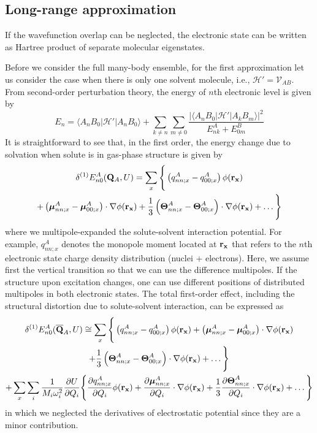 \documentclass[a4paper,titlepage,twoside,fleqn,12pt]{book}
\newcommand{\BM}[1]{\ensuremath{\mbox{\boldmath${#1}$}}}
\newcommand{\fderiv}[2]{\ensuremath{
\frac{\partial #1}{\partial #2}}}
\begin{document}
\subsection{Long-range approximation}

If the wavefunction overlap can be neglected, the electronic state
can be written as Hartree product of separate molecular eigenstates.

Before we consider the full many\hyp{}body ensemble, for the first approximation
let us consider the case when there is only
one solvent molecule, i.e., $\mathscr{H}'=\mathscr{V}_{AB}$.
From second\hyp{}order perturbation theory, the energy of $n$th electronic level
is given by
%
\begin{equation}
E_n = \langle A_nB_0 \vert \mathscr{H}' \vert A_nB_0 \rangle 
+ \sum_{k\ne n} \sum_{m\ne 0} \frac{
\lvert \langle A_nB_0 \vert \mathscr{H}' \vert A_kB_m \rangle  \rvert^2
}{E^A_{nk} + E^B_{0m}}
\end{equation}
%
It is straightforward to see that, in the first order, 
the energy change due to solvation when solute is in gas\hyp{}phase
structure is given by
%
\begin{multline}
\delta^{(1)} E^A_{n0}({\bf Q}_A, U) = \sum_{x} \Bigg\{ 
\left( q^A_{nn;x} - q^A_{00;x} \right) \phi({\bf r_x}) \\
+ \left( {\BM \mu}^A_{nn;x} - {\BM \mu}^A_{00;x} \right) \cdot \nabla \phi({\bf r_x})  
+ \frac{1}{3} \left( {\BM \Theta}^A_{nn;x} - {\BM \Theta}^A_{00;x} \right) \cdot \nabla \phi({\bf r_x}) 
+ \ldots
\Bigg\}
\end{multline}
%
where we multipole\hyp{}expanded the solute\hyp{}solvent interaction 
potential. For example, $q^A_{nn;x}$ denotes the monopole moment located at ${\bf r_x}$
that refers to the $n$th electronic state charge density distribution (nuclei + electrons).
Here, we assume first the vertical transition so that we can use the difference multipoles.
If the structure upon excitation changes, one can use different positions 
of distributed multipoles in both electronic states.
The total first\hyp{}order effect, including the structural distortion due to solute-solvent
interaction, can be expressed as
%
\begin{multline}
\delta^{(1)} E^A_{n0}({\bf \overline{Q}}_A, U) \cong \sum_{x} \Bigg\{ 
\left( q^A_{nn;x} - q^A_{00;x} \right) \phi({\bf r_x}) 
+ \left( {\BM \mu}^A_{nn;x} - {\BM \mu}^A_{00;x} \right) \cdot \nabla \phi({\bf r_x})  \\
+ \frac{1}{3} \left( {\BM \Theta}^A_{nn;x} - {\BM \Theta}^A_{00;x} \right) \cdot \nabla \phi({\bf r_x}) 
+ \ldots
\Bigg\} \\
%
+
%
\sum_{x} \sum_i \frac{1}{M_i\omega_i^2} \fderiv{U}{Q_i}
\Bigg\{ 
\fderiv{ q^A_{nn;x} }{Q_i} \phi({\bf r_x}) 
+ \fderiv{  {\BM \mu}^A_{nn;x}}{Q_i} \cdot \nabla \phi({\bf r_x})  
+ \frac{1}{3} \fderiv{ {\BM \Theta}^A_{nn;x} }{Q_i} \cdot \nabla \phi({\bf r_x}) 
+ \ldots
\Bigg\}
\end{multline}
%
in which we neglected the derivatives of electrostatic potential since they are 
a minor contribution.
\end{document}
